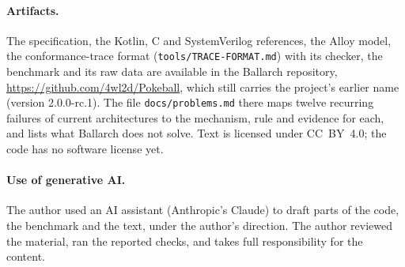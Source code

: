 \documentclass[11pt]{article}
\theoremstyle{definition}
\theoremstyle{plain}
\begin{document}
\paragraph{Artifacts.} The specification, the Kotlin, C and SystemVerilog references, the Alloy model, the conformance-trace format (\texttt{tools/TRACE-FORMAT.md}) with its checker, the benchmark and its raw data are available in the Ballarch repository, \url{https://github.com/4wl2d/Pokeball}, which still carries the project's earlier name (version 2.0.0-rc.1). The file \texttt{docs/problems.md} there maps twelve recurring failures of current architectures to the mechanism, rule and evidence for each, and lists what Ballarch does not solve. Text is licensed under CC~BY~4.0; the code has no software license yet.

\paragraph{Use of generative AI.} The author used an AI assistant (Anthropic's Claude) to draft parts of the code, the benchmark and the text, under the author's direction. The author reviewed the material, ran the reported checks, and takes full responsibility for the content.



\end{document}
